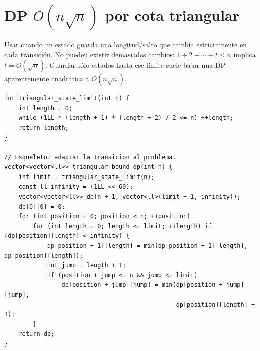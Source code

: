 \section{DP $O(n\sqrt n)$ por cota triangular}

Usar cuando un estado guarda una longitud/salto que cambia estrictamente en
cada transici\'on. No pueden existir demasiados cambios: $1+2+\cdots+t\le n$
implica $t=O(\sqrt n)$. Guardar s\'olo estados hasta ese l\'imite suele bajar una
DP aparentemente cuadr\'atica a $O(n\sqrt n)$.


\begin{lstlisting}[style=cpp]
int triangular_state_limit(int n) {
    int length = 0;
    while (1LL * (length + 1) * (length + 2) / 2 <= n) ++length;
    return length;
}

// Esqueleto: adaptar la transicion al problema.
vector<vector<ll>> triangular_bound_dp(int n) {
    int limit = triangular_state_limit(n);
    const ll infinity = (1LL << 60);
    vector<vector<ll>> dp(n + 1, vector<ll>(limit + 1, infinity));
    dp[0][0] = 0;
    for (int position = 0; position < n; ++position)
        for (int length = 0; length <= limit; ++length) if (dp[position][length] < infinity) {
            dp[position + 1][length] = min(dp[position + 1][length], dp[position][length]);
            int jump = length + 1;
            if (position + jump <= n && jump <= limit)
                dp[position + jump][jump] = min(dp[position + jump][jump],
                                                dp[position][length] + 1);
        }
    return dp;
}
\end{lstlisting}

